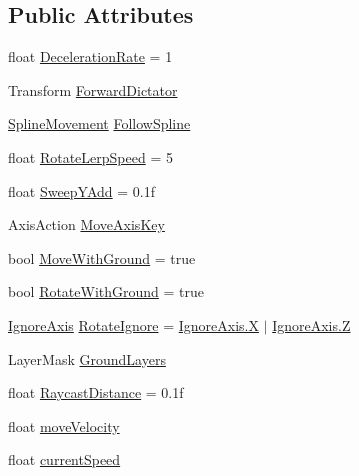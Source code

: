 \subsection*{Public Attributes}
\begin{DoxyCompactItemize}
\item 
float \mbox{\hyperlink{class_animal_movement_ae514c884c8eb98e4b21eed0219e2fea5}{Deceleration\+Rate}} = 1
\item 
Transform \mbox{\hyperlink{class_animal_movement_a699040bd8fe7cac326c62b93c2248ee0}{Forward\+Dictator}}
\item 
\mbox{\hyperlink{class_spline_movement}{Spline\+Movement}} \mbox{\hyperlink{class_animal_movement_a03fe5bb09df01348e477660e63ee0b28}{Follow\+Spline}}
\item 
float \mbox{\hyperlink{class_animal_movement_a518271696ae1161577cf3999fa0ae93c}{Rotate\+Lerp\+Speed}} = 5
\item 
float \mbox{\hyperlink{class_animal_movement_ad8807562e391a924199f420eed40e6ba}{Sweep\+Y\+Add}} = 0.\+1f
\item 
Axis\+Action \mbox{\hyperlink{class_animal_movement_a0e2d0c0b3fe2fa0d0777cba809fd56ae}{Move\+Axis\+Key}}
\item 
bool \mbox{\hyperlink{class_animal_movement_a60fedb1b7c82f4d2322253dbdc3d82f9}{Move\+With\+Ground}} = true
\item 
bool \mbox{\hyperlink{class_animal_movement_a82027772be00ed9b175e7a65848d88a2}{Rotate\+With\+Ground}} = true
\item 
\mbox{\hyperlink{_ignore_axis_8cs_aa61b0141055d583a4f5b013297a1d48f}{Ignore\+Axis}} \mbox{\hyperlink{class_animal_movement_abe1357180ff4eb0ad9a0f7cc886a252b}{Rotate\+Ignore}} = \mbox{\hyperlink{_ignore_axis_8cs_aa61b0141055d583a4f5b013297a1d48fa02129bb861061d1a052c592e2dc6b383}{Ignore\+Axis.\+X}} $\vert$ \mbox{\hyperlink{_ignore_axis_8cs_aa61b0141055d583a4f5b013297a1d48fa21c2e59531c8710156d34a3c30ac81d5}{Ignore\+Axis.\+Z}}
\item 
Layer\+Mask \mbox{\hyperlink{class_animal_movement_a40e11d2a05542f83a9cda374437e1551}{Ground\+Layers}}
\item 
float \mbox{\hyperlink{class_animal_movement_a77461117bfd11a143fc92795d517aa89}{Raycast\+Distance}} = 0.\+1f
\item 
float \mbox{\hyperlink{class_animal_movement_a44a9971f842144f953ba86af6e1a76f8}{move\+Velocity}}
\item 
float \mbox{\hyperlink{class_animal_movement_ada208ed3d52f913996f3d4df70e84bbe}{current\+Speed}}
\end{DoxyCompactItemize}


